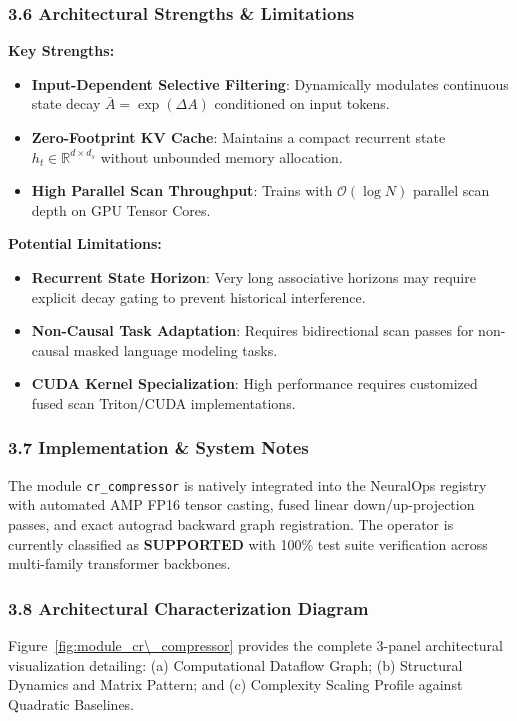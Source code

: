 \subsubsection*{3.6 Architectural Strengths \& Limitations}
\textbf{Key Strengths:}
\begin{itemize}
    \item \textbf{Input-Dependent Selective Filtering}: Dynamically modulates continuous state decay $\bar{A} = \exp(\Delta A)$ conditioned on input tokens.
    \item \textbf{Zero-Footprint KV Cache}: Maintains a compact recurrent state $h_t \in \mathbb{R}^{d \times d_s}$ without unbounded memory allocation.
    \item \textbf{High Parallel Scan Throughput}: Trains with $\mathcal{O}(\log N)$ parallel scan depth on GPU Tensor Cores.
\end{itemize}

\textbf{Potential Limitations:}
\begin{itemize}
    \item \textbf{Recurrent State Horizon}: Very long associative horizons may require explicit decay gating to prevent historical interference.
    \item \textbf{Non-Causal Task Adaptation}: Requires bidirectional scan passes for non-causal masked language modeling tasks.
    \item \textbf{CUDA Kernel Specialization}: High performance requires customized fused scan Triton/CUDA implementations.
\end{itemize}

\subsubsection*{3.7 Implementation \& System Notes}
The module \texttt{cr\_compressor} is natively integrated into the NeuralOps registry with automated AMP FP16 tensor casting, fused linear down/up-projection passes, and exact autograd backward graph registration. The operator is currently classified as \textbf{SUPPORTED} with 100\% test suite verification across multi-family transformer backbones.

\subsubsection*{3.8 Architectural Characterization Diagram}
Figure~\ref{fig:module_cr\_compressor} provides the complete 3-panel architectural visualization detailing: (a) Computational Dataflow Graph; (b) Structural Dynamics and Matrix Pattern; and (c) Complexity Scaling Profile against Quadratic Baselines.

